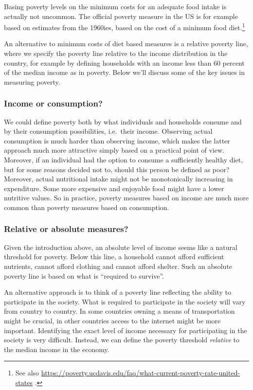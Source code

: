 \documentclass[]{book}
\let\rmarkdownfootnote\footnote%
\def\footnote{\protect\rmarkdownfootnote}
\begin{document}
Basing poverty levels on the minimum costs for an adequate food intake is actually not uncommon. The official poverty measure in the US is for example based on estimates from the 1960ies, based on the cost of a minimum food diet.\footnote{See also \url{https://poverty.ucdavis.edu/faq/what-current-poverty-rate-united-states} .}

An alternative to minimum costs of diet based measures is a relative poverty line, where we specify the poverty line relative to the income distribution in the country, for example by defining households with an income less than 60 percent of the median income as in poverty. Below we'll discuss some of the key issues in measuring poverty.

\hypertarget{income-or-consumption}{%
\subsubsection{Income or consumption?}\label{income-or-consumption}}

We could define poverty both by what individuals and households consume and by their consumption possibilities, i.e.~their income. Observing actual consumption is much harder than observing income, which makes the latter approach much more attractive simply based on a practical point of view. Moreover, if an individual had the option to consume a sufficiently healthy diet, but for some reasons decided not to, should this person be defined as poor? Moreover, actual nutritional intake might not be monotonically increasing in expenditure. Some more expensive and enjoyable food might have a lower nutritive values. So in practice, poverty measures based on income are much more common than poverty measures based on consumption.

\hypertarget{relative-or-absolute-measures}{%
\subsubsection{Relative or absolute measures?}\label{relative-or-absolute-measures}}

Given the introduction above, an absolute level of income seems like a natural threshold for poverty. Below this line, a household cannot afford sufficient nutrients, cannot afford clothing and cannot afford shelter. Such an absolute poverty line is based on what is ``required to survive''.

An alternative approach is to think of a poverty line reflecting the ability to participate in the society. What is required to participate in the society will vary from country to country. In some countries owning a means of transportation might be crucial, in other countries access to the internet might be more important. Identifying the exact level of income necessary for participating in the society is very difficult. Instead, we can define the poverty threshold \emph{relative} to the median income in the economy.
\end{document}
